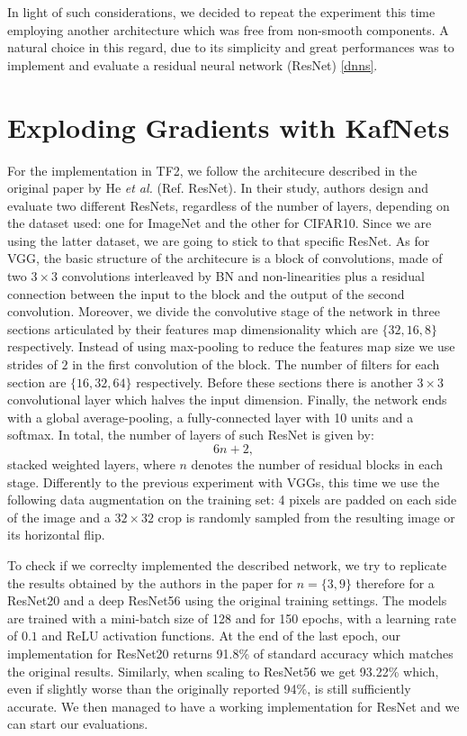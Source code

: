 \documentclass[LaM,binding=0.6cm]{./packages/sapthesis/sapthesis}
\begin{document}
        In light of such considerations, we decided to repeat the experiment this time employing another 
        architecture which was free from non-smooth components. A natural choice in this regard, 
        due to its simplicity and great performances was to implement and evaluate a residual neural 
        network (ResNet) \ref{dnns}.  


    \section{Exploding Gradients with KafNets}

        For the implementation in TF2, we follow the architecure described in the original paper by He \textit{et al.} (Ref. ResNet).
        In their study, authors design and evaluate two different ResNets, regardless of the number of layers, depending on the dataset used: 
        one for ImageNet and the other for CIFAR10. Since we are using the latter dataset, we are going to stick to that specific ResNet.
        As for VGG, the basic structure of the architecure is a block of convolutions, made of two $3\times3$ convolutions interleaved by BN and non-linearities 
        plus a residual connection between the input to the block and the output of the second convolution. Moreover, we divide the convolutive stage 
        of the network in three sections articulated by their features map dimensionality which are $\{32, 16, 8\}$ respectively. Instead of using 
        max-pooling to reduce the features map size we use strides of $2$ in the first convolution of the block. The number of filters for 
        each section are $\{16, 32, 64\}$ respectively. Before these sections there is another $3\times3$ convolutional layer which halves the input dimension.
        Finally, the network ends with a global average-pooling, a fully-connected layer with 10 units and a softmax.
        In total, the number of layers of such ResNet is given by:
        \begin{equation}
            6n+2,
        \end{equation}
        stacked weighted layers, where $n$ denotes the number of residual blocks in each stage.
        Differently to the previous experiment with VGGs, this time we use the following data augmentation on the training set:
        4 pixels are padded on each side of the image and a $32\times32$ crop is randomly sampled from the resulting image or its horizontal flip.

        To check if we correclty implemented the described network, we try to replicate the results obtained by the authors in the paper for $n=\{3, 9\}$ therefore 
        for a ResNet20 and a deep ResNet56 using the original training settings. The models are trained with a mini-batch size of 128 and for 150 epochs, with a learning rate of $0.1$ and ReLU
        activation functions. At the end of the last epoch, our implementation for ResNet20 returns 91.8\% of standard accuracy which matches the original results. Similarly, when scaling to ResNet56 we get 93.22\% which, even if slightly
        worse than the originally reported 94\%, is still sufficiently accurate. We then managed to have a working implementation for ResNet and we can start our evaluations.  
        
\end{document}
